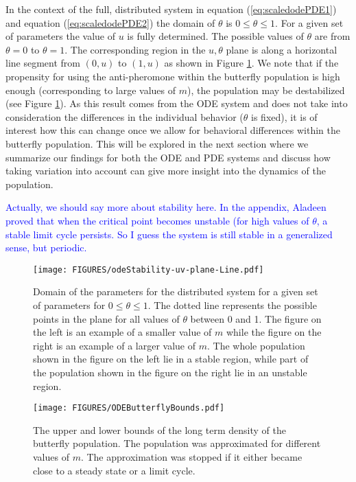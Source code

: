 \documentclass[review,authoryear]{elsarticle}
\begin{document}
In the context of the full, distributed system in equation
(\ref{eq:scaledodePDE1}) and equation (\ref{eq:scaledodePDE2}) the
domain of $\theta$ is $0\leq\theta\leq 1$. For a given set of
parameters the value of $u$ is fully determined. The possible values of $\theta$
are from $\theta=0$ to $\theta=1$.  The corresponding region in the $u,\theta$
plane is along a horizontal line segment from $(0,u)$ to
$(1,u)$ as shown in Figure \ref{fig:distributedLineSegment}. We note that if the propensity for using the anti-pheromone within the butterfly population is high enough (corresponding to large values of $m$), the population may be destabilized (see Figure \ref{fig:distributedLineSegment}). As this result comes from the ODE system and does not take into consideration the differences in the individual behavior ($\theta$ is fixed), it is of interest how this can change once we allow for behavioral differences within the butterfly population. This will be explored in the next section where we summarize our findings for both the ODE and PDE systems and discuss how taking variation into account can give more insight into the dynamics of the population. 

\textcolor{blue}  {Actually, we should say more about stability here.  In the appendix, Aladeen proved that when the critical point becomes unstable (for high values of $\theta$, a stable limit cycle persists.  So I guess the system is still stable in a generalized sense, but periodic.}

\begin{figure}[htb]
  \centering
  \texttt{[image: FIGURES/odeStability-uv-plane-Line.pdf]}
  \caption[Domain of the distributed system in the $u,\theta$
  plane.]{Domain of the parameters for the distributed system for a
    given set of parameters for $0\leq\theta\leq 1$. The dotted line
    represents the possible points in the plane
    for all values of $\theta$ between 0 and 1. The figure on the left is an example of a
    smaller value of $m$ while the figure on the right is an example
    of a larger value of $m$. The whole population shown in the figure
    on the left lie in a stable region, while part of the population
    shown in the figure on the right lie in an unstable region.}
  \label{fig:distributedLineSegment}
\end{figure}

\begin{figure}[htb]
  \centering
  \texttt{[image: FIGURES/ODEButterflyBounds.pdf]}
  \caption[Upper and lower bounds of the butterfly density.]{The upper
    and lower bounds of the long term density of the butterfly
    population. The population was approximated for different values
    of $m$. The approximation was stopped if it either became close to
    a steady state or a limit cycle.}
  \label{fig:odeButterflyBifurcation}
\end{figure}
\end{document}
